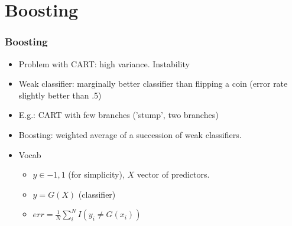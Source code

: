 \documentclass[
  shownotes,
  xcolor={svgnames},
  hyperref={colorlinks,citecolor=DarkBlue,linkcolor=DarkRed,urlcolor=DarkBlue}
  , aspectratio=169]{beamer}
\begin{document}
\section{Boosting}
\begin{frame}[fragile]
\frametitle{Boosting}

\begin{itemize}
\item Problem with CART: high variance. Instability
\medskip
\item Weak classifier: marginally better classifier than flipping a coin (error rate slightly better than .5)
\medskip
\item E.g.: CART with few branches ('stump', two branches)
\medskip
\item Boosting: weighted average of a succession of weak classifiers.
\medskip
\item Vocab
\medskip
  \begin{itemize}
  \item $y \in {-1,1}$ (for simplicity), $X$ vector of predictors.
  \medskip
  \item $y = G (X)$ (classifier)
  \medskip
  \item $err = \frac{1}{N} \sum_{i}^N I(y_i\neq G(x_i))$
  \end{itemize}
\end{itemize}


\end{frame}

\end{document}

